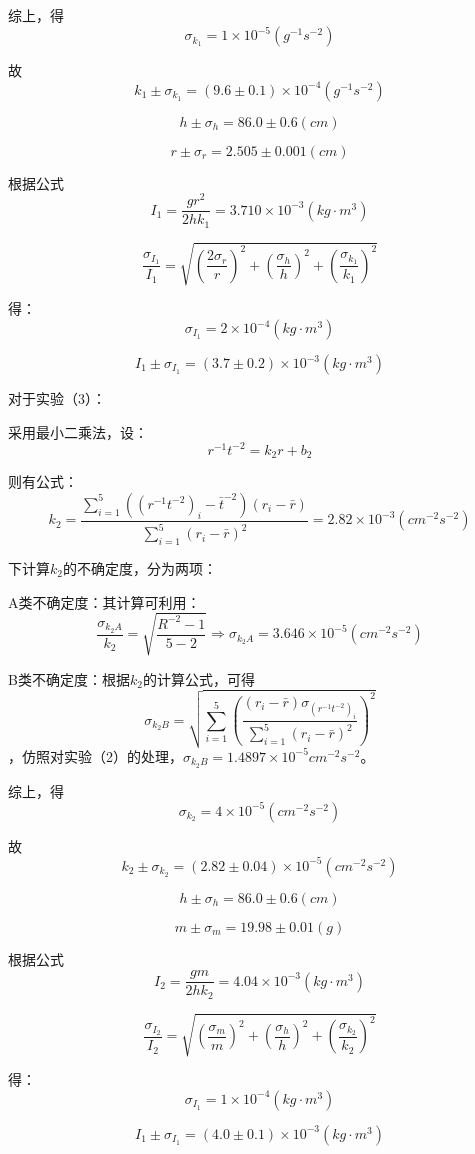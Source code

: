 \documentclass{ctexart}
\begin{document}
      综上，得$$\sigma_{k_1}=1\times10^{-5}(g^{-1}s^{-2})$$

      故$$k_1\pm\sigma_{k_1}=(9.6\pm0.1)\times10^{-4}(g^{-1}s^{-2})$$

      $$h\pm\sigma_h=86.0\pm0.6(cm)$$

      $$r\pm\sigma_r=2.505\pm0.001(cm)$$

      根据公式$$I_1=\frac{gr^2}{2hk_1}=3.710\times10^{-3}(kg\cdot m^3)$$

      $$\frac{\sigma_{I_1}}{I_1}=\sqrt{(\frac{2\sigma_r}{r})^2+(\frac{\sigma_h}{h})^2+(\frac{\sigma_{k_1}}{k_1})^2}$$

      得：$$\sigma_{I_1}=2\times10^{-4}(kg\cdot m^3)$$

      $$I_1\pm\sigma_{I_1}=(3.7\pm0.2)\times10^{-3}(kg\cdot m^3)$$
      
      对于实验（3）：

      采用最小二乘法，设：$$r^{-1}t^{-2}=k_2r+b_2$$
      
      则有公式：$$k_2=\frac{\sum\limits_{i=1}^5{((r^{-1}t^{-2})_i-\bar{t}^{-2})}(r_i-\bar{r})}{\sum\limits_{i=1}^5{(r_i-\bar{r})^2}}=2.82\times10^{-3}(cm^{-2}s^{-2})$$

      下计算$k_2$的不确定度，分为两项：
      
      A类不确定度：其计算可利用：$$\frac{\sigma_{k_2A}}{k_2}=\sqrt{\frac{R^{-2}-1}{5-2}}\Rightarrow\sigma_{k_2A}=3.646\times10^{-5}(cm^{-2}s^{-2})$$

      B类不确定度：根据$k_2$的计算公式，可得$$\sigma_{k_2B}=\sqrt{\sum\limits_{i=1}^5({\frac{(r_i-\bar{r})\sigma_{(r^{-1}t^{-2})_i}}{\sum\limits_{i=1}^5{(r_i-\bar{r})^2}}})^2}$$，仿照对实验（2）的处理，$\sigma_{k_2B}=1.4897\times10^{-5}{cm^{-2}s^{-2}}$。

      综上，得$$\sigma_{k_2}=4\times10^{-5}(cm^{-2}s^{-2})$$

      故$$k_2\pm\sigma_{k_2}=(2.82\pm0.04)\times10^{-5}(cm^{-2}s^{-2})$$

      $$h\pm\sigma_h=86.0\pm0.6(cm)$$

      $$m\pm\sigma_m=19.98\pm0.01(g)$$

      根据公式$$I_2=\frac{gm}{2hk_2}=4.04\times10^{-3}(kg\cdot m^3)$$

      $$\frac{\sigma_{I_2}}{I_2}=\sqrt{(\frac{\sigma_m}{m})^2+(\frac{\sigma_h}{h})^2+(\frac{\sigma_{k_2}}{k_2})^2}$$

      得：$$\sigma_{I_1}=1\times10^{-4}(kg\cdot m^3)$$

      $$I_1\pm\sigma_{I_1}=(4.0\pm0.1)\times10^{-3}(kg\cdot m^3)$$
\end{document}
